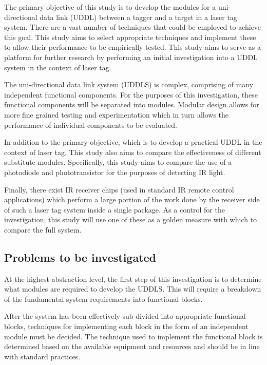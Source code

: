 The primary objective of this study is to develop the modules for a uni-directional data link (UDDL) between a tagger and a target in a laser tag system. There are a vast number of techniques that could be employed to achieve this goal. This study aims to select appropriate techniques and implement these to allow their performance to be empirically tested. This study aims to serve as a platform for further research by performing an initial investigation into a UDDL system in the context of laser tag.

The uni-directional data link system (UDDLS) is complex, comprising of many independent functional components. For the purposes of this investigation, these functional components will be separated into modules. Modular design allows for more fine grained testing and experimentation which in turn allows the performance of individual components to be evaluated.

In addition to the primary objective, which is to develop a practical UDDL in the context of laser tag. This study also aims to compare the effectiveness of different substitute modules. Specifically, this study aims to compare the use of a photodiode and phototransistor for the purposes of detecting IR light.

Finally, there exist IR receiver chips (used in standard IR remote control applications) which perform a large portion of the work done by the receiver side of such a laser tag system inside a single package. As a control for the investigation, this study will use one of these as a golden measure with which to compare the full system.

\subsection{Problems to be investigated}

At the highest abstraction level, the first step of this investigation is to determine what modules are required to develop the UDDLS. This will require a breakdown of the fundamental system requirements into functional blocks.

After the system has been effectively sub-divided into appropriate functional blocks, techniques for implementing each block in the form of an independent module must be decided. The technique used to implement the functional block is determined based on the available equipment and resources and should be in line with standard practices.

